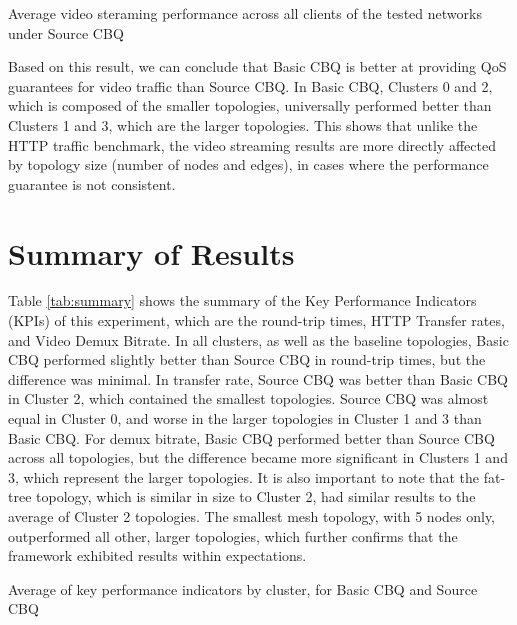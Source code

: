 \begin{table}[htbp]
    \caption{Average video steraming performance across all clients of the tested networks under Source CBQ}
    \centering
    
    \label{tab:sbq_vlc}
\end{table}

Based on this result, we can conclude that Basic CBQ is better at providing QoS guarantees for video traffic than Source CBQ. In Basic CBQ, Clusters 0 and 2, which is composed of the smaller topologies, universally performed better than Clusters 1 and 3, which are the larger topologies. This shows that unlike the HTTP traffic benchmark, the video streaming results are more directly affected by topology size (number of nodes and edges), in cases where the performance guarantee is not consistent.

\section{Summary of Results}

Table \ref{tab:summary} shows the summary of the Key Performance Indicators (KPIs) of this experiment, which are the round-trip times, HTTP Transfer rates, and Video Demux Bitrate. In all clusters, as well as the baseline topologies, Basic CBQ performed slightly better than Source CBQ in round-trip times, but the difference was minimal. In transfer rate, Source CBQ was better than Basic CBQ in Cluster 2, which contained the smallest topologies. Source CBQ was almost equal in Cluster 0, and worse in the larger topologies in Cluster 1 and 3 than Basic CBQ. For demux bitrate, Basic CBQ performed better than Source CBQ across all topologies, but the difference became more significant in Clusters 1 and 3, which represent the larger topologies. It is also important to note that the fat-tree topology, which is similar in size to Cluster 2, had similar results to the average of Cluster 2 topologies. The smallest mesh topology, with 5 nodes only, outperformed all other, larger topologies, which further confirms that the framework exhibited results within expectations.

\begin{table}[htbp]
    \caption{Average of key performance indicators by cluster, for Basic CBQ and Source CBQ}
    \centering
    
    \label{tab:summary}
\end{table}

